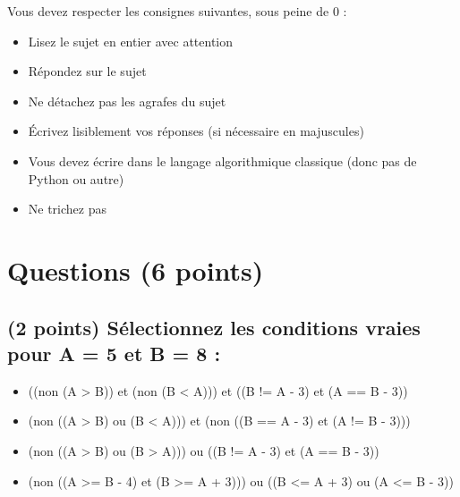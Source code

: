 \documentclass[11pt,a4paper]{article}
\begin{document}
\MakeExamTitle                   %


\bigskip

Vous devez respecter les consignes suivantes, sous peine de 0 :

\begin{itemize}
\item Lisez le sujet en entier avec attention
\item Répondez sur le sujet
\item Ne détachez pas les agrafes du sujet
\item \'Ecrivez lisiblement vos réponses (si nécessaire en majuscules)
\item Vous devez écrire dans le langage algorithmique classique (donc pas de Python ou autre)
\item Ne trichez pas
\end{itemize}



\section{Questions (6 points)}

\subsection{(2 points) Sélectionnez les conditions vraies pour A = 5 et B = 8 : }

\bigskip

\begin{itemize}
  \item[\checkmark] ((non (A > B)) et (non (B < A))) et ((B != A - 3) et (A == B - 3)) \\ %
  \item[\checkmark] (non ((A > B) ou (B < A))) et (non ((B == A - 3) et (A != B - 3))) \\ %
  \item[\checkmark] (non ((A > B) ou (B > A))) ou ((B != A - 3) et (A == B - 3)) \\ %
  \item[\checkmark] (non ((A >= B - 4) et (B >= A + 3))) ou ((B <= A + 3) ou (A <= B - 3)) \\ %
\end{itemize}
\end{document}
